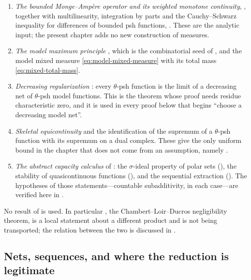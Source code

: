\begin{enumerate}
\item\label{itm:ch25-import:ma}
 \emph{The bounded Monge--Amp\`ere operator and its weighted monotone
 continuity}, , together with
 multilinearity, integration by parts and the Cauchy--Schwarz inequality for
 differences of bounded psh functions,
 .  These are the analytic input; the
 present chapter adds no new construction of measures.
\item\label{itm:ch25-import:model}
 \emph{The model maximum principle} ,
 which is the combinatorial seed of
 , and the model mixed measure
 \eqref{eq:model-mixed-measure} with its total mass
 \eqref{eq:mixed-total-mass}.
\item\label{itm:ch25-import:reg}
 \emph{Decreasing regularization} :
 every $\theta$-psh function is the limit of a decreasing net of
 $\theta$-psh model functions.  This is the theorem whose proof needs
 residue characteristic zero, and it is used in every proof below that
 begins ``choose a decreasing model net''.
\item\label{itm:ch25-import:equi}
 \emph{Skeletal equicontinuity}  and
 the identification  of the supremum of a
 $\theta$-psh function with its supremum on a dual complex.  These give
 the only uniform bound in the chapter that does not come from an
 assumption, namely .
\item\label{itm:ch25-import:tools}
 \emph{The abstract capacity calculus} of : the
 $\sigma$-ideal property of polar sets
 (), the stability of quasicontinuous
 functions (), and the sequential
 extraction ().  The hypotheses of those
 statements---countable subadditivity, in each case---are verified here in
 .
\end{enumerate}

No result of  is used.  In particular
, the Chambert--Loir--Ducros negligibility
theorem, is a local statement about a different product and is not being
transported; the relation between the two is discussed in
.

\subsection{Nets, sequences, and where the reduction is legitimate}
\label{sec:ch25-nets}

